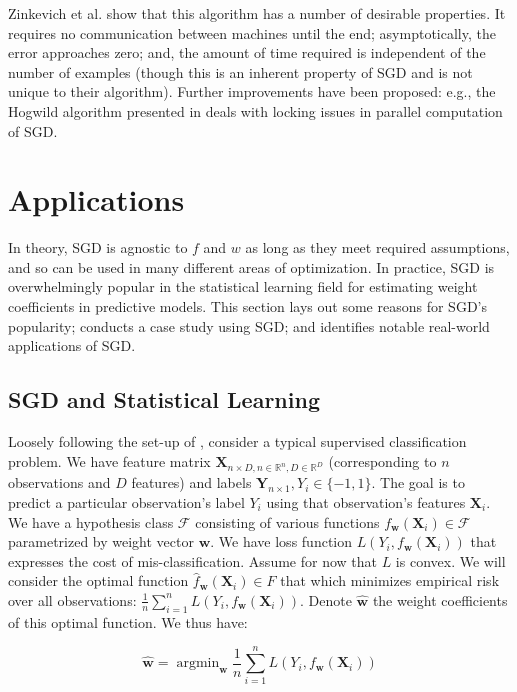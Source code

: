 \documentclass{article}
\DeclareMathOperator*{\argmin}{argmin}
\begin{document}
\medskip

Zinkevich et al. show that this algorithm has a number of desirable properties.
It requires no communication between machines until the end; asymptotically, the
error approaches zero; and, the amount of time required is independent of the number of
examples (though this is an inherent property of SGD and is not unique to their
algorithm). Further improvements have been proposed: e.g., the Hogwild algorithm
presented in \cite{recht2011hogwild} deals with locking issues in parallel
computation of SGD.

\section{Applications}

In theory, SGD is agnostic to $f$ and $w$ as long as they meet required
assumptions, and so can be used in many different areas of optimization. In
practice, SGD is overwhelmingly popular in the statistical learning
field for estimating weight coefficients in predictive models. 
This section lays out some reasons for SGD's popularity; conducts a case study
using SGD; and identifies notable real-world applications of SGD. 

\subsection{SGD and Statistical Learning}
\cite{shalev2011pegasos}

Loosely following the set-up of , consider a typical supervised classification problem. We have
feature matrix $\bm{X}_{n \times D, n \in \mathbb{R}^n, D \in \mathbb{R}^D}$ (corresponding to $n$ observations and $D$
features) and labels $\bm{Y}_{n \times 1}, Y_i \in \{-1, 1\}$. The goal is to
predict a particular observation's label $Y_i$ using that observation's features $\bm{X}_i$. 
We have a hypothesis class $\mathcal{F}$ consisting of
various functions $f_{\bm{w}}(\bm{X}_i) \in \mathcal{F}$ parametrized by weight
vector $\bm{w}$. We have loss function $L(Y_i, f_{\bm{w}}(\bm{X}_i))$ that
expresses the cost of mis-classification. Assume for now that $L$ is convex. 
We will consider the optimal function $\hat{f}_{\bm{w}}(\bm{X}_i) \in F$ 
that which minimizes empirical risk over all observations: $\frac{1}{n}
\sum_{i=1}^n L(Y_i, f_{\bm{w}}(\bm{X}_i))$.
Denote $\hat{\bm{w}}$ the weight coefficients of this optimal function. We thus
have:

\begin{equation}
	\hat{\bm{w}} = \argmin_{\bm{w}}\frac{1}{n} \sum_{i=1}^n L(Y_i, f_{\bm{w}}(\bm{X}_i))
\end{equation}
\end{document}
